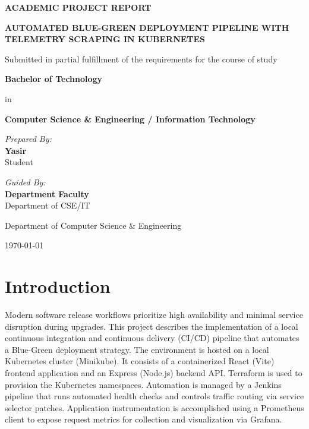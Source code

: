 \documentclass[12pt,a4paper]{article}
\begin{document}
\begin{titlepage}
    \centering
    \vspace*{1.5cm}
    {\huge\bfseries ACADEMIC PROJECT REPORT \par}
    \vspace{0.8cm}
    {\Large\bfseries AUTOMATED BLUE-GREEN DEPLOYMENT PIPELINE WITH TELEMETRY SCRAPING IN KUBERNETES \par}
    \vspace{2.5cm}
    {\large Submitted in partial fulfillment of the requirements for the course of study \par}
    \vspace{0.3cm}
    {\large\bfseries Bachelor of Technology \par}
    {\large in \par}
    {\large\bfseries Computer Science \& Engineering / Information Technology \par}
    \vspace{3.5cm}
    \begin{minipage}{0.4\textwidth}
        \begin{flushleft} \large
            \emph{Prepared By:}\\
            \textbf{Yasir} \\
            Student
        \end{flushleft}
    \end{minipage}
    \hfill
    \begin{minipage}{0.4\textwidth}
        \begin{flushright} \large
            \emph{Guided By:} \\
            \textbf{Department Faculty} \\
            Department of CSE/IT
        \end{flushright}
    \end{minipage}
    \vfill
    {\large Department of Computer Science \& Engineering \par}
    \vspace{0.5cm}
    {\large \today \par}
\end{titlepage}

\tableofcontents
\newpage

\section{Introduction}
Modern software release workflows prioritize high availability and minimal service disruption during upgrades. This project describes the implementation of a local continuous integration and continuous delivery (CI/CD) pipeline that automates a Blue-Green deployment strategy. The environment is hosted on a local Kubernetes cluster (Minikube). It consists of a containerized React (Vite) frontend application and an Express (Node.js) backend API. Terraform is used to provision the Kubernetes namespaces. Automation is managed by a Jenkins pipeline that runs automated health checks and controls traffic routing via service selector patches. Application instrumentation is accomplished using a Prometheus client to expose request metrics for collection and visualization via Grafana.
\end{document}
